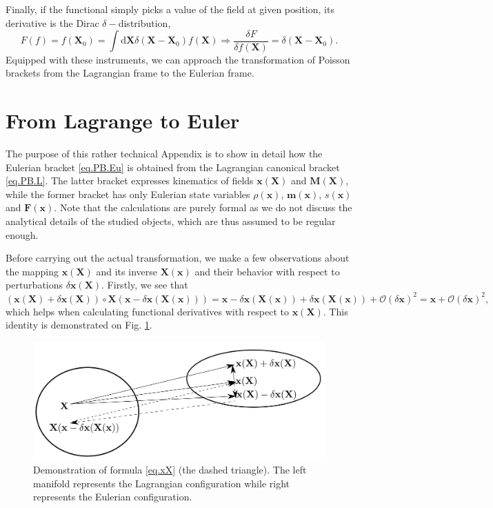 \documentclass[
10pt, %
a4paper, %
oneside, %
headinclude,footinclude, %
BCOR5mm, %
]{scrartcl}
\newcommand{\xx}{\mathbf{x}}
\newcommand{\XX}{\mathbf{X}}
\newcommand{\diff}{\mathrm{d}}
\newcommand{\mm}{\mathbf{m}}
\newcommand{\MM}{\mathbf{M}}
\newcommand{\OBig}{\mathcal{O}}
\newcommand{\FF}{\mathbf{F}}
\newcommand{\Ffunc}{F}
\begin{document}
Finally, if the functional simply picks a value of the field at given position, its derivative is the Dirac $\delta-$distribution, 
\begin{equation}
\Ffunc(f) = f(\XX_0) = \int\diff \XX \delta(\XX-\XX_0)f(\XX) \Rightarrow 
\frac{\delta \Ffunc}{\delta f(\XX)} = \delta(\XX-\XX_0).
\end{equation}
Equipped with these instruments, we can approach the transformation of Poisson brackets from the Lagrangian frame to the Eulerian frame.

\section{From Lagrange to Euler}\label{sec.L-E}
The purpose of this rather technical Appendix is to show in detail how the Eulerian bracket \eqref{eq.PB.Eu} is obtained from the Lagrangian canonical bracket \eqref{eq.PB.L}. The latter bracket expresses kinematics of fields $\xx(\XX)$ and $\MM(\XX)$, while the former bracket has only Eulerian state variables $\rho(\xx)$, $\mm(\xx)$, $s(\xx)$ and $\FF(\xx)$. Note that the calculations are purely formal as we do not discuss the analytical details of the studied objects, which are thus assumed to be regular enough.

Before carrying out the actual transformation, we make a few observations about the mapping $\xx(\XX)$ and its inverse $\XX(\xx)$ and their behavior with respect to perturbations $\delta \xx(\XX)$. Firstly, we see that
\begin{equation}\label{eq.xX}
	(\xx(\XX) + \delta\xx(\XX))\circ \XX(\xx-\delta \xx(\XX(\xx))) = \xx -\delta\xx(\XX(\xx)) + \delta\xx(\XX(\xx)) + \OBig(\delta\xx)^2
= \xx + \OBig(\delta\xx)^2,
\end{equation}
which helps when calculating functional derivatives with respect to $\xx(\XX)$. This identity is demonstrated on Fig. \ref{fig.trafo}.
\begin{figure}
    \centering
    \includegraphics[scale=0.3]{trafo.png}
    \caption{Demonstration of formula \eqref{eq.xX} (the dashed triangle). The left manifold represents the Lagrangian configuration while right represents the Eulerian configuration. }
    \label{fig.trafo}
\end{figure}
\end{document}
